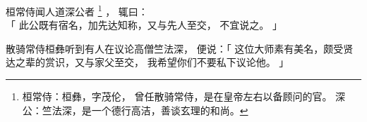 
\switchcolumn*[\section{}]

桓常侍闻人道深公者%
\footnote{%
    桓常侍：桓彝，字茂伦，
            曾任散骑常侍，是在皇帝左右以备顾问的官。
    深公：竺法深，是一个德行高洁，善谈玄理的和尚。
}%
，
辄曰：\\「
    此公既有宿名，加先达知称，又与先人至交，
    不宜说之。
」

\switchcolumn

散骑常侍桓彝听到有人在议论高僧竺法深，
便说：「
    这位大师素有美名，颇受贤达之辈的赏识，又与家父至交，
    我希望你们不要私下议论他。
」

